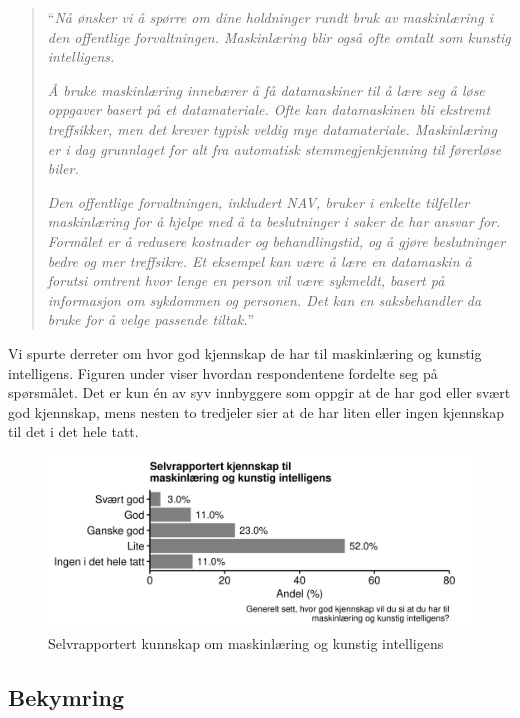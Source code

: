 \documentclass[
  12pt,
  a4paper, 12pt]{article}
\begin{document}
\begin{quote}
``\emph{Nå ønsker vi å spørre om dine holdninger rundt bruk av maskinlæring i den offentlige forvaltningen. Maskinlæring blir også ofte omtalt som kunstig intelligens.}

\emph{Å bruke maskinlæring innebærer å få datamaskiner til å lære seg å løse oppgaver basert på et datamateriale. Ofte kan datamaskinen bli ekstremt treffsikker, men det krever typisk veldig mye datamateriale. Maskinlæring er i dag grunnlaget for alt fra automatisk stemmegjenkjenning til førerløse biler.}

\emph{Den offentlige forvaltningen, inkludert NAV, bruker i enkelte tilfeller maskinlæring for å hjelpe med å ta beslutninger i saker de har ansvar for. Formålet er å redusere kostnader og behandlingstid, og å gjøre beslutninger bedre og mer treffsikre. Et eksempel kan være å lære en datamaskin å forutsi omtrent hvor lenge en person vil være sykmeldt, basert på informasjon om sykdommen og personen. Det kan en saksbehandler da bruke for å velge passende tiltak.}''
\end{quote}

Vi spurte derreter om hvor god kjennskap de har til maskinlæring og kunstig intelligens.
Figuren under viser hvordan respondentene fordelte seg på spørsmålet.
Det er kun én av syv innbyggere som oppgir at de har god eller svært god kjennskap, mens nesten to tredjeler sier at de har liten eller ingen kjennskap til det i det hele tatt.

\begin{figure}

{\centering \includegraphics[width=0.8\linewidth]{figs/png/fig_ml_knowledge} 

}

\caption{Selvrapportert kunnskap om maskinlæring og kunstig intelligens}\label{fig:unnamed-chunk-15}
\end{figure}

\hypertarget{bekymring}{%
\subsection{Bekymring}\label{bekymring}}
\end{document}
